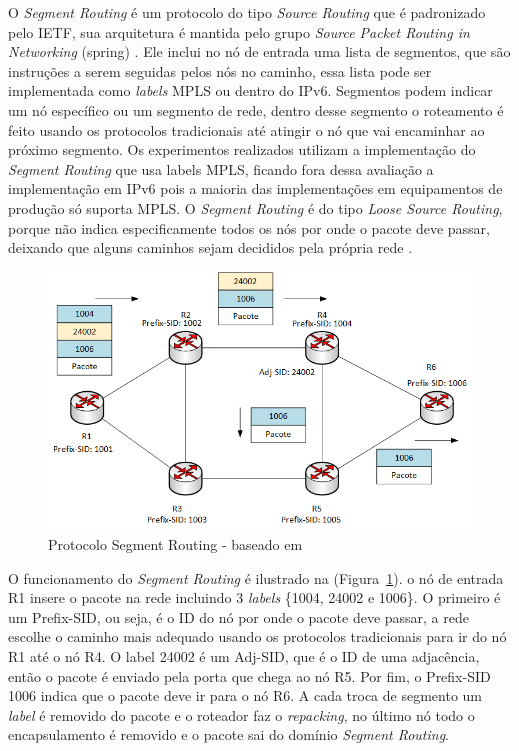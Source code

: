 \documentclass[12pt]{article}
\begin{document}
O \textit{Segment Routing} é um protocolo do tipo \textit{Source Routing} que é padronizado pelo IETF, sua arquitetura é mantida pelo grupo \textit{Source Packet Routing in Networking} (spring) \cite{gang2018throughput}. Ele inclui no nó de entrada uma lista de segmentos, que são instruções a serem seguidas pelos nós no caminho, essa lista pode ser implementada como \textit{labels} MPLS ou dentro do IPv6. Segmentos podem indicar um nó específico ou um segmento de rede, dentro desse segmento o roteamento é feito usando os protocolos tradicionais até atingir o nó que vai encaminhar ao próximo segmento. Os experimentos realizados utilizam a implementação do \textit{Segment Routing} que usa labels MPLS, ficando fora dessa avaliação a implementação em IPv6 pois a maioria das implementações em equipamentos de produção só suporta MPLS. O \textit{Segment Routing} é do tipo \textit{Loose Source Routing}, porque não indica especificamente todos os nós por onde o pacote deve passar, deixando que alguns caminhos sejam decididos pela própria rede \cite{kushwaha2020survey}.

\begin{figure}[ht]
\centering
\includegraphics[width=.5\textwidth]{Segment Routing.png}
\caption{Protocolo Segment Routing - baseado em \cite{kushwaha2020survey}}
\label{fig:segmentrouting}
\end{figure}

O funcionamento do \textit{Segment Routing} é ilustrado na (Figura~\ref{fig:segmentrouting}). o nó de entrada R1 insere o pacote na rede incluindo 3 \textit{labels} \{1004, 24002 e 1006\}. O primeiro é um Prefix-SID, ou seja, é o ID do nó por onde o pacote deve passar, a rede escolhe o caminho mais adequado usando os protocolos tradicionais para ir do nó R1 até o nó R4. O label 24002 é um Adj-SID, que é o ID de uma adjacência, então o pacote é enviado pela porta que chega ao nó R5. Por fim, o Prefix-SID 1006 indica que o pacote deve ir para o nó R6. A cada troca de segmento um \textit{label} é removido do pacote e o roteador faz o \textit{repacking}, no último nó todo o encapsulamento é removido e o pacote sai do domínio \textit{Segment Routing}.
\end{document}
